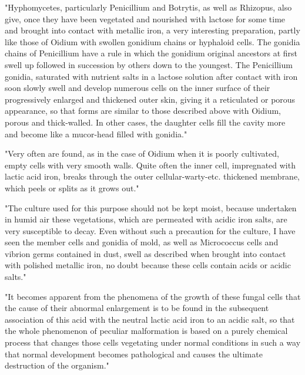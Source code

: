 \documentclass[a4paper, 12pt, oneside]{article}
\begin{document}
"Hyphomycetes, particularly Penicillium and Botrytis, as well as Rhizopus, also give, once they have been vegetated and nourished with lactose for some time and brought into contact with metallic iron, a very interesting preparation, partly like those of Oidium with swollen gonidium chains or hyphaloid cells. The gonidia chains of Penicillium have a rule in which the gonidium original ancestors at first swell up followed in succession by others down to the youngest. The Penicillium gonidia, saturated with nutrient salts in a lactose solution after contact with iron soon slowly swell and develop numerous cells on the inner surface of their progressively enlarged and thickened outer skin, giving it a reticulated or porous appearance, so that forms are similar to those described above with Oidium, porous and thick-walled. In other cases, the daughter cells fill the cavity more and become like a mucor-head filled with gonidia."

"Very often are found, as in the case of Oidium when it is poorly cultivated, empty cells with very smooth walls. Quite often the inner cell, impregnated with lactic acid iron, breaks through the outer cellular-warty-etc. thickened membrane, which peels or splits as it grows out."

"The culture used for this purpose should not be kept moist, because undertaken in humid air these vegetations, which are permeated with acidic iron salts, are very susceptible to decay. Even without such a precaution for the culture, I have seen the member cells and gonidia of mold, as well as Micrococcus cells and vibrion germs contained in dust, swell as described when brought into contact with polished metallic iron, no doubt because these cells contain acids or acidic salts."

"It becomes apparent from the phenomena of the growth of these fungal cells that the cause of their abnormal enlargement is to be found in the subsequent association of this acid with the neutral lactic acid iron to an acidic salt, so that the whole phenomenon of peculiar malformation is based on a purely chemical process that changes those cells vegetating under normal conditions in such a way that normal development becomes pathological and causes the ultimate destruction of the organism."
\end{document}
